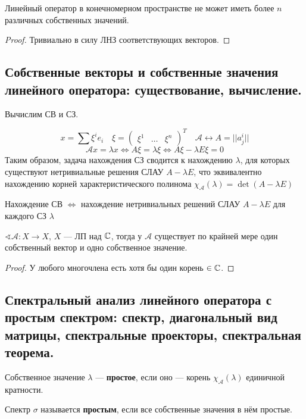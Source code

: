\begin{lemma}
    Линейный оператор в конечномерном пространстве не может иметь более $n$ различных собственных значений.
\end{lemma}
\begin{proof}
    Тривиально в силу ЛНЗ соответствующих векторов.
\end{proof}

\subsection{Собственные векторы и собственные значения линейного оператора: существование, вычисление. }

Вычислим СВ и СЗ.

$$x = \sum \xi^i e_i \quad \xi = \begin{pmatrix}
        \xi^1 & \ldots & \xi^n
    \end{pmatrix}^T \quad \mathcal A \leftrightarrow A = ||a^i_j||$$
$$\mathcal A x = \lambda x \Leftrightarrow A \xi = \lambda \xi \Leftrightarrow A \xi - \lambda E \xi = 0$$
Таким образом, задача нахождения СЗ сводится к нахождению $\lambda$, для которых существуют нетривиальные решения СЛАУ $A-\lambda E$, что эквивалентно нахождению корней характеристического полинома $\chi_{\mathcal A}(\lambda) = \det(A - \lambda E)$

Нахождение СВ $\Leftrightarrow$ нахождение нетривиальных решений СЛАУ $A - \lambda E$ для каждого СЗ $\lambda$

\begin{lemma}
    $\sphericalangle \mathcal A : X \to X$, $X$ --- ЛП над $\mathbb{C}$, тогда у $\mathcal A$ существует по крайней мере один собственный вектор и одно собственное значение.
\end{lemma}
\begin{proof}
    У любого многочлена есть хотя бы один корень $\in \mathbb{C}$.
\end{proof}

\subsection{Спектральный анализ линейного оператора с простым спектром: спектр, диагональный вид матрицы, спектральные проекторы, спектральная теорема.}
\begin{definition}
    Собственное значение $\lambda$ --- \textbf{простое}, если оно --- корень $\chi_{\mathcal A}(\lambda)$ единичной кратности.
\end{definition}
\begin{definition}
    Спектр $\sigma$ называется \textbf{простым}, если все собственные значения в нём простые.
\end{definition}

